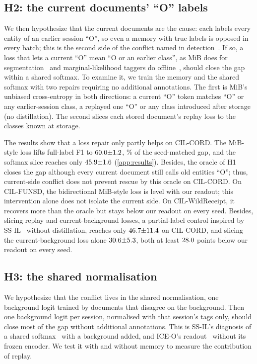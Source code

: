 \documentclass[10pt,twocolumn,letterpaper]{article}
\begin{document}
\subsection{H2: the current documents' ``O'' labels}
\label{sec:h2}
We then hypothesize that the current documents are the cause: each labels every entity of an earlier session ``O'', so even a memory with true labels is opposed in every batch; this is the second side of the conflict named in detection~\citep{mo2024bpf}. If so, a loss that lets a current ``O'' mean ``O or an earlier class'', as MiB does for segmentation~\citep{cermelli2020mib} and marginal-likelihood taggers do offline~\citep{greenberg2018marginal}, should close the gap within a shared softmax. To examine it, we train the memory and the shared softmax with two repairs requiring no additional annotations. The first is MiB's unbiased cross-entropy in both directions: a current ``O'' token matches ``O'' or any earlier-session class, a replayed one ``O'' or any class introduced after storage (no distillation). The second slices each stored document's replay loss to the classes known at storage.

The results show that a loss repair only partly helps on CIL-CORD. The MiB-style loss lifts full-label F1 to $60.0{\pm}1.2$, \nMibShareFull\% of the seed-matched gap, and the softmax slice reaches only $45.9{\pm}1.6$ (\cref{app:results}). Besides, the oracle of H1 closes the gap although every current document still calls old entities ``O''; thus, current-side conflict does not prevent rescue by this oracle on CIL-CORD. On CIL-FUNSD, the bidirectional MiB-style loss is level with our readout; this intervention alone does not isolate the current side. On CIL-WildReceipt, it recovers more than the oracle but stays below our readout on every seed. Besides, slicing replay and current-background losses, a partial-label control inspired by SS-IL~\citep{ahn2021ssil} without distillation, reaches only $46.7{\pm}11.4$ on CIL-CORD, and slicing the current-background loss alone $30.6{\pm}5.3$, both at least $28.0$ points below our readout on every seed.

\subsection{H3: the shared normalisation}
\label{sec:h3}
We hypothesize that the conflict lives in the shared normalisation, one background logit trained by documents that disagree on the background. Then one background logit per session, normalised with that session's tags only, should close most of the gap without additional annotations. This is SS-IL's diagnosis of a shared softmax~\citep{ahn2021ssil} with a background added, and ICE-O's readout~\citep{liu2023ice} without its frozen encoder. We test it with and without memory to measure the contribution of replay.
\end{document}
